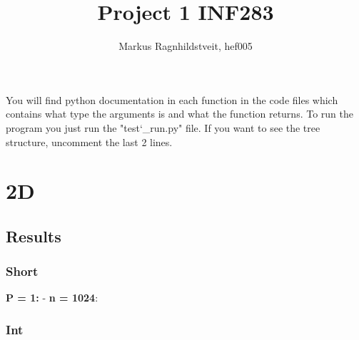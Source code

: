 \documentclass[a4paper]{extarticle}
\title{Project 1 INF283}
\author{Markus Ragnhildstveit, hef005}
\begin{document}
\maketitle

\tableofcontents
\newpage
You will find python documentation in each function in the code files which contains what type the arguments is and what the function returns. To run the program you just run the "test\char`_run.py" file. If you want to see the tree structure, uncomment the last 2 lines.

\section{2D}

\subsection{Results}
\subsubsection{Short}
\textbf{P = 1:}
- \textbf{n = 1024}: 



\subsubsection{Int}
\end{document}
